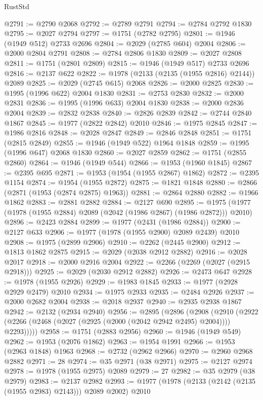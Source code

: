 \begin{lexlean}{RustStd}
\begin{coremodule}
@2791 := @2790 @2068
@2792 := @2789 @2791
@2794 := @2784 @2792 @1830
@2795 := @2027 @2794
@2797 := @1751 (@2782 @2795)
@2801 := @1946 (@1949 @512) @2733 @2696
@2804 := @2029 (@2785 @604) @2004
@2806 := @2000 @2804 @2791
@2808 := @2784 @2806 @1830
@2809 := @2027 @2808
@2811 := @1751 (@2801 @2809)
@2815 := @1946 (@1949 @517) @2733 @2696
@2816 := @2137 @622
@2822 := @1978 (@2133 (@2135 (@1955 @2816) @2144)) @2089
@2825 := @2029 (@2745 @615) @2068
@2826 := @2000 @2825
@2830 := @1995 (@1996 @622) @2004 @1830
@2831 := @2753 @2830
@2832 := @2000 @2831
@2836 := @1995 (@1996 @633) @2004 @1830
@2838 := @2000 @2836 @2004
@2839 := @2832 @2838
@2840 := @2826 @2839
@2842 := @2744 @2840 @1867
@2845 := @1977 (@2822 @2842) @2010
@2846 := @1975 @2845
@2847 := @1986 @2816
@2848 := @2028 @2847
@2849 := @2846 @2848
@2851 := @1751 (@2815 @2849)
@2855 := @1946 (@1949 @522) @1964 @1848
@2859 := @1995 (@1996 @647) @2068 @1830
@2860 := @2027 @2859
@2862 := @1751 (@2855 @2860)
@2864 := @1946 (@1949 @544)
@2866 := @1953 (@1960 @1845)
@2867 := @2395 @695
@2871 := @1953 (@1954 (@1955 @2867) @1862)
@2872 := @2395 @1154
@2874 := @1954 (@1955 @2872)
@2875 := @1821 @1848
@2880 := @2866 (@2871 (@1953 (@2874 @2875) @1963))
@2881 := @2864 @2880
@2882 := @1966 @1862
@2883 := @2881 @2882
@2884 := @2127 @690
@2895 := @1975 (@1977 (@1978 (@1955 @2884) @2089 (@2042 (@1986 @2867) (@1986 @2872))) @2010)
@2896 := @2423 @2884
@2899 := @1977 (@2431 (@1986 @2884))
@2900 := @2127 @633
@2906 := @1977 (@1978 (@1955 @2900) @2089 @2439) @2010
@2908 := @1975 (@2899 @2906)
@2910 := @2262 (@2445 @2900)
@2912 := @1813 @1862 @2875
@2915 := @2029 (@2038 @2912 @2882)
@2916 := @2028 @2017
@2918 := @2000 @2916 @2004
@2922 := @2266 (@2269 (@2027 (@2915 @2918)))
@2925 := @2029 (@2030 @2912 @2882)
@2926 := @2473 @647
@2928 := @1978 (@1955 @2926)
@2929 := @1983 @1845
@2933 := @1977 (@2928 @2929 @2479) @2010
@2934 := @1975 @2933
@2935 := @2484 @2926
@2937 := @2000 @2682 @2004
@2938 := @2018 @2937
@2940 := @2935 @2938 @1867
@2942 := @2132 (@2934 @2940)
@2956 := @2895
    (@2896
      (@2908
        (@2910 (@2922 (@2266 (@2468 (@2027 (@2925 (@2000 (@2042 @2942 @2495) @2004)))) @2293)))))
@2958 := @1751 (@2883 @2956)
@2960 := @1946 (@1949 @549)
@2962 := @1953 (@2076 @1862)
@2963 := @1954 @1991
@2966 := @1953 (@2963 @1848) @1963
@2968 := @2732 (@2962 @2966)
@2970 := @2960 @2968 @2882
@2971 := 28
@2974 := @35 @2971 (@38 @2971)
@2975 := @2127 @2974
@2978 := @1978 (@1955 @2975) @2089
@2979 := 27
@2982 := @35 @2979 (@38 @2979)
@2983 := @2137 @2982
@2993 := @1977 (@1978 (@2133 (@2142 (@2135 (@1955 @2983) @2143))) @2089 @2002) @2010

\end{coremodule}
\end{lexlean}
